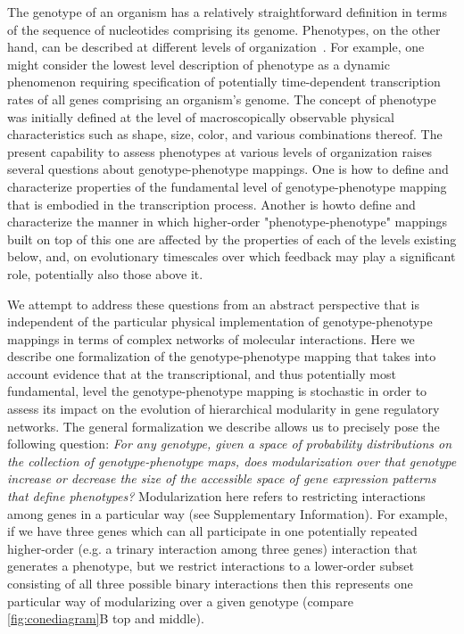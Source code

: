 The genotype of an organism has a relatively straightforward definition in terms of the sequence of nucleotides comprising its genome. Phenotypes, on the other hand, can be described at different levels of organization~\cite{Dawkins1982,Stadler2001}. For example, one might consider the lowest level description of phenotype as a dynamic phenomenon requiring specification of potentially time-dependent transcription rates of all genes comprising an organism's genome. The concept of phenotype was initially defined at the level of macroscopically observable physical characteristics such as shape, size, color, and various combinations thereof. The present capability to assess phenotypes at various levels of organization raises several questions about genotype-phenotype mappings. One is how to define and characterize properties of the fundamental level of genotype-phenotype mapping that is embodied in the transcription process. Another is howto define and characterize the manner in which higher-order "phenotype-phenotype" mappings built on top of this one are affected by the properties of each of the levels existing below, and, on evolutionary timescales over which feedback may play a significant role, potentially also those above it.

We attempt to address these questions from an abstract perspective that is independent of the particular physical implementation of genotype-phenotype mappings in terms of complex networks of molecular interactions. Here we describe one formalization of the genotype-phenotype mapping that takes into account evidence that at the transcriptional, and thus potentially most fundamental, level the genotype-phenotype mapping is stochastic \cite{Swain2002,Paulsson2004,Thattai2004,Acar2008a,Lestas2010,So2011,Munsky2012,Neuert2013,Sanchez2013} in order to assess its impact on the evolution of hierarchical modularity in gene regulatory networks. The general formalization we describe allows us to precisely pose the following question: \emph{For any genotype, given a space of probability distributions on the collection of genotype-phenotype maps, does modularization over that genotype increase or decrease the size of the accessible space of gene expression patterns that define phenotypes?} Modularization here refers to restricting interactions among genes in a particular way (see Supplementary Information). For example, if we have three genes which can all participate in one potentially repeated higher-order (e.g. a trinary interaction among three genes) interaction that generates a phenotype, but we restrict interactions to a lower-order subset consisting of all three possible binary interactions then this represents one particular way of modularizing over a given genotype (compare \ref{fig:conediagram}B top and middle).

